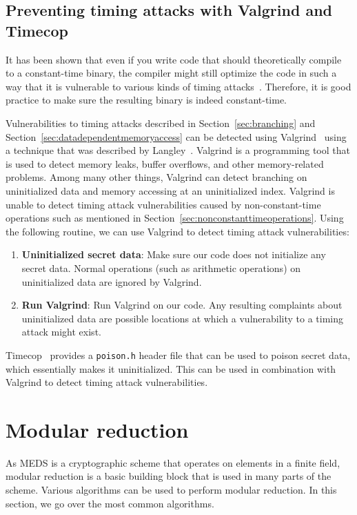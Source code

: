 \documentclass[11pt,a4paper]{report}
\theoremstyle{definition}
\begin{document}
\subsection{Preventing timing attacks with Valgrind and Timecop}
\label{sec:valgrindtimecop}
It has been shown that even if you write code that should theoretically compile to a constant-time binary, the compiler might still optimize the code in such a way that it is vulnerable to various kinds of timing attacks~\cite{barthe2019formal, simon2018you}. Therefore, it is good practice to make sure the resulting binary is indeed constant-time.

Vulnerabilities to timing attacks described in Section~\ref{sec:branching} and Section~\ref{sec:datadependentmemoryaccess} can be detected using Valgrind~\cite{nethercote2007valgrind} using a technique that was described by Langley~\cite{langley2010checking}. Valgrind is a programming tool that is used to detect memory leaks, buffer overflows, and other memory-related problems. Among many other things, Valgrind can detect branching on uninitialized data and memory accessing at an uninitialized index. Valgrind is unable to detect timing attack vulnerabilities caused by non-constant-time operations such as mentioned in Section~\ref{sec:nonconstanttimeoperations}. Using the following routine, we can use Valgrind to detect timing attack vulnerabilities:
\begin{enumerate}
  \item \textbf{Uninitialized secret data}: Make sure our code does not initialize any secret data. Normal operations (such as arithmetic operations) on uninitialized data are ignored by Valgrind.
  \item \textbf{Run Valgrind}: Run Valgrind on our code. Any resulting complaints about uninitialized data are possible locations at which a vulnerability to a timing attack might exist.
\end{enumerate}

Timecop~\cite{timecop} provides a \texttt{poison.h} header file that can be used to poison secret data, which essentially makes it uninitialized. This can be used in combination with Valgrind to detect timing attack vulnerabilities.

\section{Modular reduction}
\label{sec:preliminariesmodularreduction}
As MEDS is a cryptographic scheme that operates on elements in a finite field, modular reduction is a basic building block that is used in many parts of the scheme. Various algorithms can be used to perform modular reduction. In this section, we go over the most common algorithms.
\end{document}
